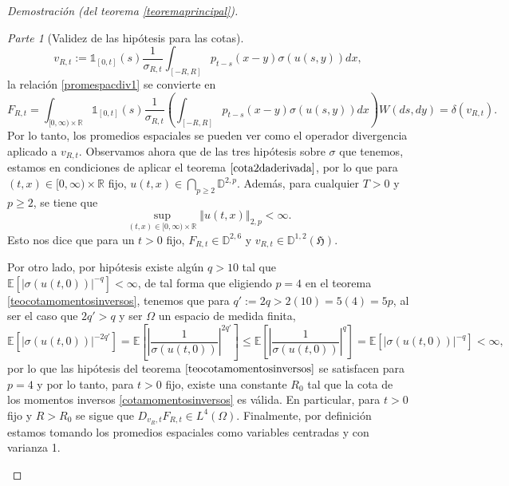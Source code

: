 \documentclass[letterpaper,twoside,12pt]{book}
\newcommand{\R}{\mathbb{R}}
\newcommand{\D}{\mathbb{D}}
\newcommand{\E}{\mathbb{E}}
\newcommand{\1}{\mathds{1}}
\newcommand{\abs}[1]{\left\lvert #1 \right\rvert}
\newcommand{\norm}[1]{\left\Vert #1 \right\Vert}
\theoremstyle{definition}
\theoremstyle{definition}
\theoremstyle{remark}
\newtheorem{proofpart}{Parte}
\theoremstyle{definition}
\theoremstyle{definition}
\theoremstyle{definition}
\theoremstyle{definition}
\theoremstyle{definition}
\begin{document}
\begin{proof}[Demostración (del teorema \ref{teoremaprincipal})]
\begin{proofpart}[Validez de las hipótesis para las cotas]
\begin{equation}\label{vectordireccion}
      v_{R,t}:=\1_{[0,t]}(s)\frac{1}{\sigma_{R,t}}\int_{[-R,R]}p_{t-s}(x-y)\sigma(u(s,y))dx,
\end{equation}
 la relación \eqref{promespacdiv1} se convierte en
\begin{equation}\label{promespacialdiv2}
F_{R,t}=\int_{[0,\infty)\times \R}\1_{[0,t]}(s)\frac{1}{\sigma_{R,t}}\left(\int_{[-R,R]}p_{t-s}(x-y)\sigma(u(s,y))dx\right)W(ds,dy)=\delta(v_{R,t}).
\end{equation}
Por lo tanto, los promedios espaciales se pueden ver como el operador divergencia aplicado a $v_{R,t}$. Observamos ahora que de las tres hipótesis sobre $\sigma$ que tenemos, estamos en condiciones de aplicar el teorema $\ref{cota2daderivada}$, por lo que para $(t,x)\in [0,\infty)\times\R$ fijo, $u(t,x)\in \bigcap_{p\geq2} \D^{2,p}$. Además, para cualquier $T>0$ y $p\geq2$, se tiene que 
\[
   \sup_{(t,x)\in [0,\infty)\times\R}\norm{u(t,x)}_{2,p}<\infty.
\]
Esto nos dice que para un $t>0$ fijo, $F_{R,t}\in \D^{2,6}$ y $v_{R,t}\in \D^{1,2}(\mathfrak{H})$. 

Por otro lado, por hipótesis existe algún $q>10$ tal que $\E\left[\abs{\sigma(u(t,0))}^{-q}\right]<\infty$, de tal forma que eligiendo $p=4$ en el teorema \ref{teocotamomentosinversos}, tenemos que para $q':=2q>2(10)=5(4)=5p$, al ser el caso que $2q'>q$ y ser $\Omega$ un espacio de medida finita, 
\[
\E\left[\abs{\sigma(u(t,0))}^{-2q'}\right]=\E\left[\abs{\frac{1}{\sigma(u(t,0))}}^{2q'}\right]\leq \E\left[\abs{\frac{1}{\sigma(u(t,0))}}^{q}\right]=\E\left[\abs{\sigma(u(t,0))}^{-q}\right]<\infty,
\]
por lo que las hipótesis del teorema $\ref{teocotamomentosinversos}$ se satisfacen para $p=4$ y por lo tanto, para $t>0$ fijo, existe una constante $R_0$ tal que la cota de los momentos inversos \eqref{cotamomentosinversos} es válida. En particular, para $t>0$ fijo y $R>R_0$ se sigue que $D_{v_R,t}F_{R,t}\in L^{4}(\Omega)$. Finalmente, por definición estamos tomando los promedios espaciales como variables centradas y con varianza 1. 


\end{proofpart}
\end{proof}
\end{document}
